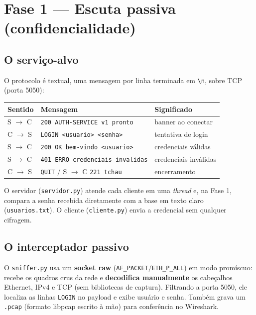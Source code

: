 \documentclass[11pt,a4paper]{article}
\newcommand{\seta}{\texorpdfstring{$\rightarrow$}{->}}
\begin{document}
\section{Fase 1 — Escuta passiva (confidencialidade)}

\subsection{O serviço-alvo}
O protocolo é textual, uma mensagem por linha terminada em \texttt{\textbackslash n},
sobre TCP (porta 5050):

\begin{center}\small
\begin{tabular}{@{}lll@{}}
\toprule
Sentido & Mensagem & Significado \\
\midrule
S \seta{} C & \texttt{200 AUTH-SERVICE v1 pronto} & banner ao conectar \\
C \seta{} S & \texttt{LOGIN <usuario> <senha>} & tentativa de login \\
S \seta{} C & \texttt{200 OK bem-vindo <usuario>} & credenciais válidas \\
S \seta{} C & \texttt{401 ERRO credenciais invalidas} & credenciais inválidas \\
C \seta{} S & \texttt{QUIT} \;/\; S \seta{} C \texttt{221 tchau} & encerramento \\
\bottomrule
\end{tabular}
\end{center}

O servidor (\texttt{servidor.py}) atende cada cliente em uma \textit{thread} e,
na Fase 1, compara a senha recebida diretamente com a base em texto claro
(\texttt{usuarios.txt}). O cliente (\texttt{cliente.py}) envia a credencial sem
qualquer cifragem.

\subsection{O interceptador passivo}
O \texttt{sniffer.py} usa um \textbf{socket raw} (\texttt{AF\_PACKET}/\texttt{ETH\_P\_ALL})
em modo promíscuo: recebe os quadros crus da rede e \textbf{decodifica
manualmente} os cabeçalhos Ethernet, IPv4 e TCP (sem bibliotecas de captura).
Filtrando a porta 5050, ele localiza as linhas \texttt{LOGIN} no payload e exibe
usuário e senha. Também grava um \texttt{.pcap} (formato libpcap escrito à mão)
para conferência no Wireshark.
\end{document}
